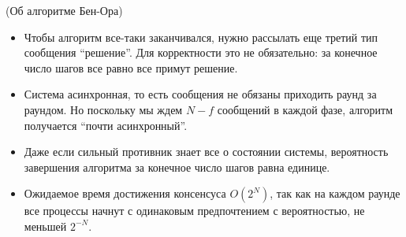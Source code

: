 \begin{remark}(Об алгоритме Бен-Ора)
    \enewline
    \begin{itemize}
        \item Чтобы алгоритм все-таки заканчивался, нужно рассылать еще третий
            тип сообщения ``решение''. Для корректности это не обязательно:
            за конечное число шагов все равно все примут решение.
        \item Система асинхронная, то есть сообщения не обязаны приходить
            раунд за раундом. Но поскольку мы ждем $N - f$ сообщений в каждой
            фазе, алгоритм получается ``почти асинхронный''.
        \item Даже если сильный противник знает все о состоянии системы,
            вероятность завершения алгоритма за конечное число шагов
            равна единице.
        \item Ожидаемое время достижения консенсуса $O(2^N)$, так как на каждом
            раунде все процессы начнут с одинаковым предпочтением
            с вероятностью, не меньшей $2^{-N}$.
    \end{itemize}
\end{remark}

